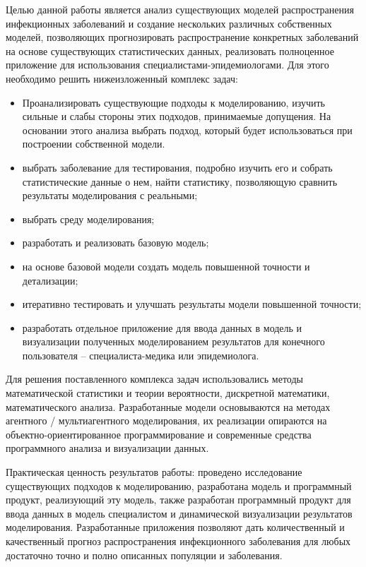 Целью данной работы является анализ существующих моделей распространения инфекционных заболеваний и  создание нескольких различных собственных моделей, позволяющих прогнозировать распространение конкретных заболеваний на основе существующих статистических данных, реализовать полноценное приложение для использования специалистами-эпидемиологами.  Для этого необходимо решить нижеизложенный комплекс задач:
\begin{itemize}
	\item Проанализировать существующие подходы к моделированию, изучить сильные и слабы стороны этих подходов, принимаемые допущения. На основании этого анализа выбрать подход, который будет использоваться при построении собственной модели.
	
	\item выбрать заболевание для тестирования, подробно изучить его и собрать статистические данные о нем, найти статистику, позволяющую сравнить результаты моделирования с реальными;
	
	\item выбрать среду моделирования;
	
	\item разработать и реализовать базовую модель;
	
	\item на основе базовой модели создать модель повышенной точности и детализации;
	
	\item итеративно тестировать и улучшать результаты модели повышенной точности; 
	
	\item разработать отдельное приложение для ввода данных в модель и визуализации полученных моделированием результатов для конечного пользователя -- специалиста-медика или эпидемиолога. 	
\end{itemize}

Для решения поставленного комплекса задач использовались методы математической статистики и теории вероятности, дискретной математики, математического анализа. Разработанные модели основываются на методах агентного / мультиагентного моделирования, их реализации опираются на объектно-ориентированное программирование и современные средства  программного анализа и визуализации данных. 

Практическая ценность результатов работы: проведено исследование существующих подходов к моделированию,	разработана модель  и программный продукт, реализующий эту модель, также разработан программный продукт для ввода данных в модель специалистом и динамической визуализации результатов моделирования. Разработанные приложения позволяют дать количественный и качественный прогноз распространения инфекционного заболевания для любых  достаточно точно и полно описанных популяции и заболевания.